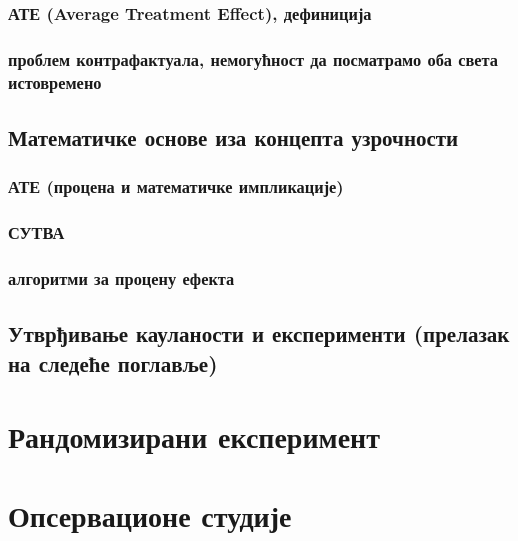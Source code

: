 \documentclass[12pt, a4paper]{article}
\begin{document}

    \subsubsection{АТЕ (Average Treatment Effect), дефиниција}
    \subsubsection{проблем контрафактуала, немогућност да посматрамо оба света истовремено}
\subsection{Математичке основе иза концепта узрочности}
    \subsubsection{АТЕ (процена и математичке импликације)}
    \subsubsection{СУТВА}
    \subsubsection{алгоритми за процену ефекта}
\subsection{Утврђивање кауланости и експерименти (прелазак на следеће поглавље)}

\newpage



\section{Рандомизирани експеримент}
\newpage



\section{Опсервационе студије}
\end{document}
